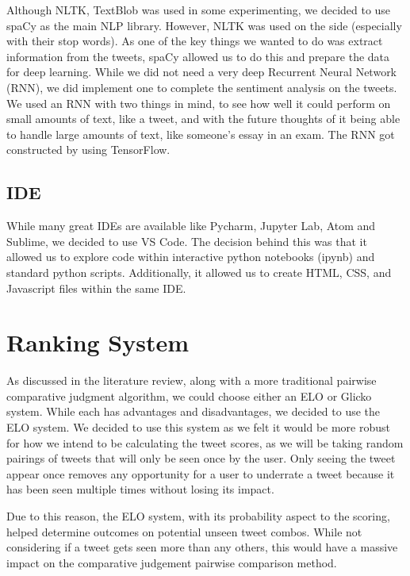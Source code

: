 	Although NLTK, TextBlob was used in some experimenting, we decided to use spaCy as the main NLP library. However, NLTK was used on the side (especially with their stop words). As one of the key things we wanted to do was extract information from the tweets, spaCy allowed us to do this and prepare the data for deep learning. While we did not need a very deep Recurrent Neural Network (RNN), we did implement one to complete the sentiment analysis on the tweets. We used an RNN with two things in mind, to see how well it could perform on small amounts of text, like a tweet, and with the future thoughts of it being able to handle large amounts of text, like someone's essay in an exam. The RNN got constructed by using TensorFlow.
	
	\subsection{IDE}
	While many great IDEs are available like Pycharm, Jupyter Lab, Atom and Sublime, we decided to use VS Code. The decision behind this was that it allowed us to explore code within interactive python notebooks (ipynb) and standard python scripts. Additionally, it allowed us to create HTML, CSS, and Javascript files within the same IDE.
	
	
	\section{Ranking System}
	
	As discussed in the literature review, along with a more traditional pairwise comparative judgment algorithm, we could choose either an ELO or Glicko system. While each has advantages and disadvantages, we decided to use the ELO system. We decided to use this system as we felt it would be more robust for how we intend to be calculating the tweet scores, as we will be taking random pairings of tweets that will only be seen once by the user. Only seeing the tweet appear once removes any opportunity for a user to underrate a tweet because it has been seen multiple times without losing its impact. 
	
	Due to this reason, the ELO system, with its probability aspect to the scoring, helped determine outcomes on potential unseen tweet combos. While not considering if a tweet gets seen more than any others, this would have a massive impact on the comparative judgement pairwise comparison method.
	
